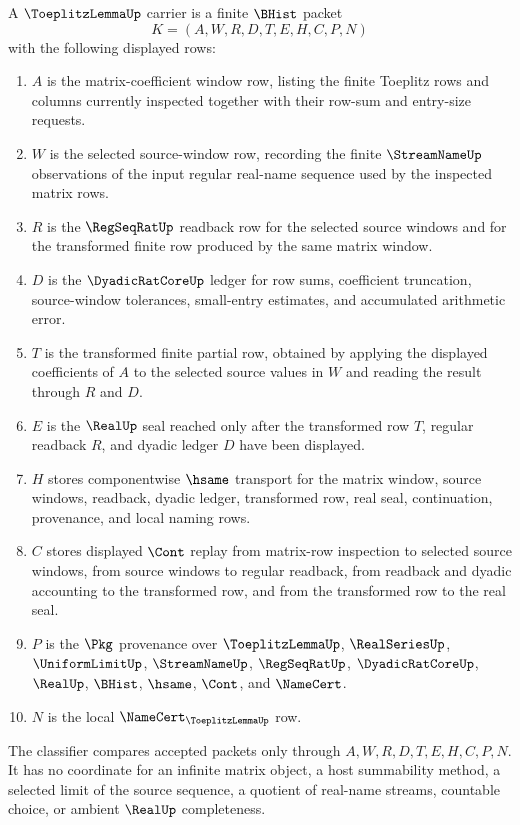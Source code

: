 \begin{definition}\label{def:toeplitz-lemma-carrier}
A $\ToeplitzLemmaUp$ carrier is a finite $\BHist$ packet
$$
K=(A,W,R,D,T,E,H,C,P,N)
$$
with the following displayed rows:
\begin{enumerate}
\item $A$ is the matrix-coefficient window row, listing the finite Toeplitz rows and columns currently inspected together with their row-sum and entry-size requests.
\item $W$ is the selected source-window row, recording the finite $\StreamNameUp$ observations of the input regular real-name sequence used by the inspected matrix rows.
\item $R$ is the $\RegSeqRatUp$ readback row for the selected source windows and for the transformed finite row produced by the same matrix window.
\item $D$ is the $\DyadicRatCoreUp$ ledger for row sums, coefficient truncation, source-window tolerances, small-entry estimates, and accumulated arithmetic error.
\item $T$ is the transformed finite partial row, obtained by applying the displayed coefficients of $A$ to the selected source values in $W$ and reading the result through $R$ and $D$.
\item $E$ is the $\RealUp$ seal reached only after the transformed row $T$, regular readback $R$, and dyadic ledger $D$ have been displayed.
\item $H$ stores componentwise $\hsame$ transport for the matrix window, source windows, readback, dyadic ledger, transformed row, real seal, continuation, provenance, and local naming rows.
\item $C$ stores displayed $\Cont$ replay from matrix-row inspection to selected source windows, from source windows to regular readback, from readback and dyadic accounting to the transformed row, and from the transformed row to the real seal.
\item $P$ is the $\Pkg$ provenance over $\ToeplitzLemmaUp$, $\RealSeriesUp$, $\UniformLimitUp$, $\StreamNameUp$, $\RegSeqRatUp$, $\DyadicRatCoreUp$, $\RealUp$, $\BHist$, $\hsame$, $\Cont$, and $\NameCert$.
\item $N$ is the local $\NameCert_{\ToeplitzLemmaUp}$ row.
\end{enumerate}
The classifier compares accepted packets only through $A,W,R,D,T,E,H,C,P,N$. It has no coordinate for an infinite matrix object, a host summability method, a selected limit of the source sequence, a quotient of real-name streams, countable choice, or ambient $\RealUp$ completeness.
\end{definition}

